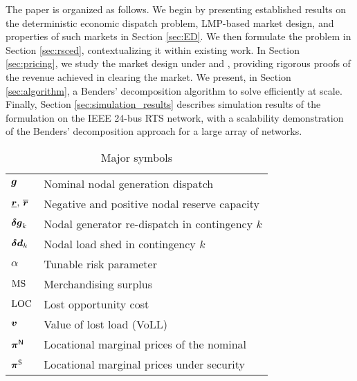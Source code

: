 The paper is organized as follows. We begin by presenting established results on the deterministic economic dispatch problem, LMP-based market design, and properties of such markets in Section \ref{sec:ED}. We then formulate the \RSCED{} problem in Section \ref{sec:rsced}, contextualizing it within existing work. In Section \ref{sec:pricing}, we study the market design under \LMPnom{} and \LMPmar{}, providing rigorous proofs of the revenue achieved in clearing the market. We present, in Section \ref{sec:algorithm}, a Benders' decomposition algorithm to solve \RSCED{} efficiently at scale. Finally, Section \ref{sec:simulation_results} describes simulation results of the \RSCED{} formulation on the IEEE 24-bus RTS network, with a scalability demonstration of the Benders' decomposition approach for a large array of networks. 

{\small
\begin{table}[htbp]
\caption{Major symbols}\label{tab:symbols}
\begin{center}
\vspace{-1em}
\begin{tabular}{ll}
\hline
${\bm{g}}$& Nominal nodal generation dispatch\\
$\underline{{{\bm{r}}}},\,\overline{{{\bm{r}}}}$& Negative and positive nodal reserve capacity\\
${\bm{\delta g}}_k$&Nodal generator re-dispatch in contingency $k$\\
${\bm{\delta d}}_k$&Nodal load shed in contingency $k$\\
$\alpha$&Tunable risk parameter\\
${\rm MS}{}$& Merchandising surplus\\
${\rm LOC}{}$& Lost opportunity cost\\
${\bm{v}}$&Value of lost load (VoLL)\\
${\bm{\pi}}^{{\sf N}}$&Locational marginal prices of the nominal\\
${\bm{\pi}}^{{\sf S}}$&Locational marginal prices under security\\
\hline
\end{tabular}
\end{center}
\end{table}
}